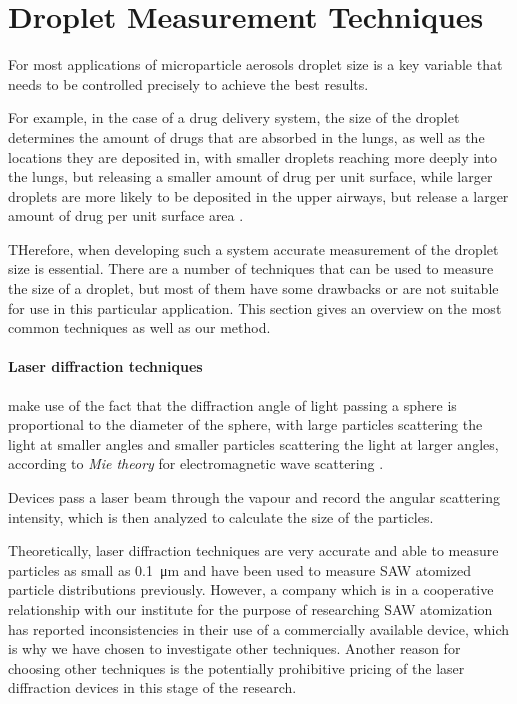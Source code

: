 \section{Droplet Measurement Techniques}
\label{sec:measurement_techniques}

For most applications of microparticle aerosols droplet size is a key variable that needs to be controlled precisely to achieve the best results.

For example, in the case of a drug delivery system, the size of the droplet determines the amount of drugs that are absorbed in the lungs, as well as the locations they are deposited in, with smaller droplets reaching more deeply into the lungs, but releasing a smaller amount of drug per unit surface, while larger droplets are more likely to be deposited in the upper airways, but release a larger amount of drug per unit surface area \cite{labirisPulmonaryDrugDelivery2003}.

THerefore, when developing such a system accurate measurement of the droplet size is essential. There are a number of techniques that can be used to measure the size of a droplet, but most of them have some drawbacks or are not suitable for use in this particular application. 
This section gives an overview on the most common techniques as well as our method.

\paragraph{Laser diffraction techniques} make use of the fact that the diffraction angle of light passing a sphere is proportional to the diameter of the sphere, with large particles scattering the light at smaller angles and smaller particles scattering the light at larger angles, according to \emph{Mie theory} for electromagnetic wave scattering \cite{drakeMieScattering1985,wriedtMieTheoryReview2012}.

Devices pass a laser beam through the vapour and record the angular scattering intensity, which is then analyzed to calculate the size of the particles. 

Theoretically, laser diffraction techniques are very accurate and able to measure particles as small as \SI{0.1}{\micro\meter} and have been used to measure SAW atomized particle distributions previously. 
However, a company which is in a cooperative relationship with our institute for the purpose of researching SAW atomization has reported inconsistencies in their use of a commercially available device, which is why we have chosen to investigate other techniques.
Another reason for choosing other techniques is the potentially prohibitive pricing of the laser diffraction devices in this stage of the research.

